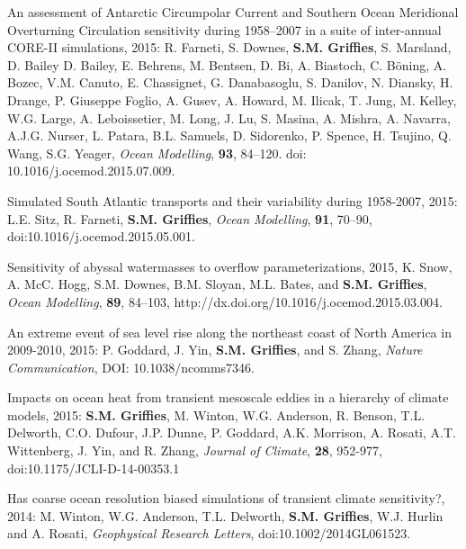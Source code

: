 \begin{etaremune}

\item An assessment of Antarctic Circumpolar Current and Southern
  Ocean Meridional Overturning Circulation sensitivity during
  1958--2007 in a suite of inter-annual CORE-II simulations, 2015:
  R. Farneti, S. Downes, {\bf S.M. Grif\/f\/ies}, S. Marsland,
  D. Bailey D. Bailey, E. Behrens, M. Bentsen, D. Bi, A. Biastoch,
  C. B\"oning, A. Bozec, V.M. Canuto, E. Chassignet, G. Danabasoglu,
  S. Danilov, N. Diansky, H. Drange, P. Giuseppe Foglio, A. Gusev,
  A. Howard, M. Ilicak, T.  Jung, M. Kelley, W.G. Large,
  A. Leboissetier, M. Long, J. Lu, S. Masina, A. Mishra, A. Navarra,
  A.J.G. Nurser, L. Patara, B.L. Samuels, D. Sidorenko, P. Spence,
  H. Tsujino, Q. Wang, S.G. Yeager, {\it Ocean Modelling}, {\bf 93},
  84--120. doi: 10.1016/j.ocemod.2015.07.009.

\item Simulated South Atlantic transports and their variability during
  1958-2007, 2015: L.E.  Sitz, R. Farneti, {\bf S.M. Grif\/f\/ies},
  {\it Ocean Modelling}, {\bf 91}, 70--90,
  doi:10.1016/j.ocemod.2015.05.001.

\item Sensitivity of abyssal watermasses to overflow
  parameterizations, 2015, K. Snow, A. McC. Hogg, S.M. Downes,
  B.M. Sloyan, M.L. Bates, and {\bf S.M. Grif\/f\/ies}, {\it Ocean
    Modelling}, {\bf 89}, 84--103,
  http://dx.doi.org/10.1016/j.ocemod.2015.03.004.

\item An extreme event of sea level rise along the northeast coast of
  North America in 2009-2010, 2015: P.  Goddard, J. Yin, {\bf
    S.M. Grif\/f\/ies}, and S. Zhang, {\it Nature Communication}, DOI:
  10.1038/ncomms7346.

\item Impacts on ocean heat from transient mesoscale eddies in a
  hierarchy of climate models, 2015: {\bf S.M. Grif\/f\/ies},
  M. Winton, W.G. Anderson, R. Benson, T.L. Delworth, C.O. Dufour,
  J.P. Dunne, P. Goddard, A.K. Morrison, A. Rosati, A.T. Wittenberg,
  J. Yin, and R. Zhang, {\it Journal of Climate}, {\bf 28}, 952-977,
  doi:10.1175/JCLI-D-14-00353.1

\item Has coarse ocean resolution biased simulations of transient
  climate sensitivity?, 2014: M.  Winton, W.G. Anderson,
  T.L. Delworth, {\bf S.M. Grif\/f\/ies}, W.J. Hurlin and A. Rosati,
  {\it Geophysical Research Letters}, doi:10.1002/2014GL061523.


\end{etaremune}
